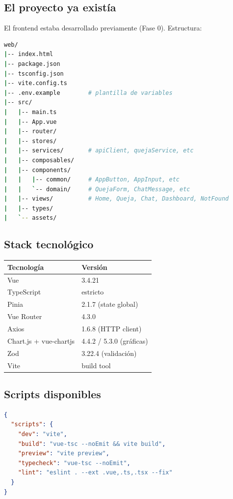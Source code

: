 \documentclass[11pt,a4paper,oneside]{article}
\begin{document}
\subsection{El proyecto ya exist\'ia}

El frontend estaba desarrollado previamente (Fase 0). Estructura:

\begin{lstlisting}[language=bash,caption={Estructura del frontend}]
web/
|-- index.html
|-- package.json
|-- tsconfig.json
|-- vite.config.ts
|-- .env.example        # plantilla de variables
|-- src/
|   |-- main.ts
|   |-- App.vue
|   |-- router/
|   |-- stores/
|   |-- services/       # apiClient, quejaService, etc
|   |-- composables/
|   |-- components/
|   |   |-- common/     # AppButton, AppInput, etc
|   |   `-- domain/     # QuejaForm, ChatMessage, etc
|   |-- views/          # Home, Queja, Chat, Dashboard, NotFound
|   |-- types/
|   `-- assets/
\end{lstlisting}

\subsection{Stack tecnol\'ogico}

\begin{center}
\begin{tabular}{ll}
\toprule
\textbf{Tecnolog\'ia} & \textbf{Versi\'on} \\
\midrule
Vue & 3.4.21 \\
TypeScript & estricto \\
Pinia & 2.1.7 (state global) \\
Vue Router & 4.3.0 \\
Axios & 1.6.8 (HTTP client) \\
Chart.js + vue-chartjs & 4.4.2 / 5.3.0 (gr\'aficas) \\
Zod & 3.22.4 (validaci\'on) \\
Vite & build tool \\
\bottomrule
\end{tabular}
\end{center}

\subsection{Scripts disponibles}

\begin{lstlisting}[language=json,caption={package.json --- scripts relevantes}]
{
  "scripts": {
    "dev": "vite",
    "build": "vue-tsc --noEmit && vite build",
    "preview": "vite preview",
    "typecheck": "vue-tsc --noEmit",
    "lint": "eslint . --ext .vue,.ts,.tsx --fix"
  }
}
\end{lstlisting}
\end{document}
